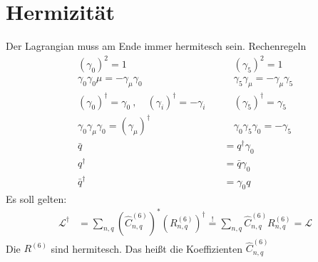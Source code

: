 \documentclass[a4,11pt]{article}
\begin{document}
\section*{Hermizität}
	Der Lagrangian muss am Ende immer hermitesch sein. Rechenregeln
\begin{align*}
	(\gamma_0)^2 = 1 \quad&\quad (\gamma_5)^2 = 1 \\
	\gamma_0\gamma_0\mu = -\gamma_\mu\gamma_0 \quad&\quad\gamma_5\gamma_\mu = -\gamma_\mu\gamma_5 \\
	(\gamma_0)^\dagger = \gamma_0 \ ,\quad(\gamma_i)^\dagger = -\gamma_i \quad&\quad(\gamma_5)^\dagger = \gamma_5 \\
	\gamma_0\gamma_\mu\gamma_0 = (\gamma_\mu)^\dagger \quad&\quad\gamma_0\gamma_5\gamma_0 = -\gamma_5 \\
	\bar{q} &= q^\dagger\gamma_0 \\
	q^\dagger &= \bar{q}\gamma_0 \\
	\bar{q}^\dagger &= \gamma_0 q
\end{align*}
Es soll gelten:
\begin{align*}
	\mathcal{L}^\dagger
	&= \sum_{n,q} \left(\hat{C}^{(6)}_{n,q}\right)^*\left(R^{(6)}_{n,q}\right)^\dagger \overset{!}{=} \sum_{n,q} \hat{C}^{(6)}_{n,q}R^{(6)}_{n,q} = \mathcal{L}
\end{align*}
Die $R^{(6)}$ sind hermitesch. Das heißt die Koeffizienten $\hat{C}^{(6)}_{n,q}$
\end{document}
